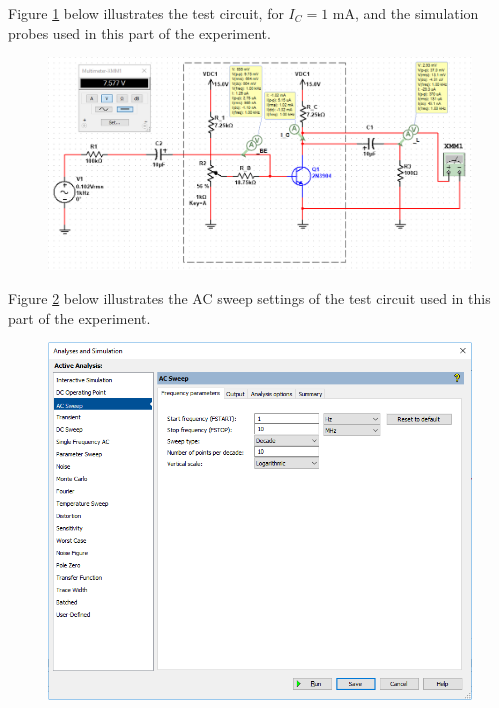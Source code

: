 \documentclass{article}
\begin{document}
	\noindent Figure \ref{f33} below illustrates the test circuit, for $I_C = 1$ mA, and the simulation probes used in this part of the experiment.
	\begin{figure}[!ht]
		\centering
		\includegraphics[width=\linewidth]{part4-e-circuit-1ma.png}
		\label{f33}
	\end{figure}

	Figure \ref{f34} below illustrates the AC sweep settings of the test circuit used in this part of the experiment.
	\begin{figure}[!ht]
		\centering
		\includegraphics[width=0.7\linewidth]{part4-e-simSettings-1ma.png}
		\label{f34}
	\end{figure}

	\pagebreak
\end{document}
